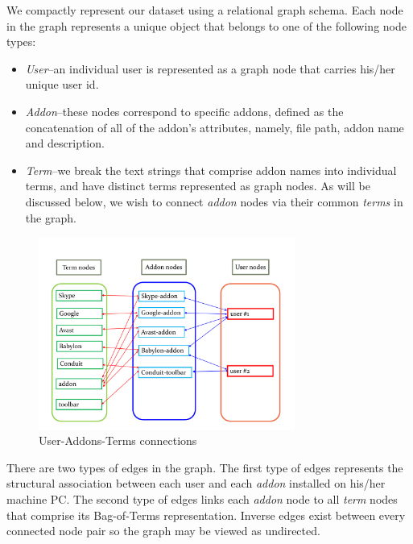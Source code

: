 \documentclass[ijoc,nonblindrev]{informs3} %
\numberwithin{equation}{subsection}
\begin{document}
We compactly represent our dataset using a relational graph schema. Each node in the graph represents a unique object that belongs to one of the following node types:
\begin{itemize}
\renewcommand{\labelitemi}{$\bullet$} 
\item {\it User}--an individual user is represented as a graph node that carries his/her unique user id. 
\item {\it Addon}--these nodes correspond to specific addons, defined as the concatenation of all of the addon's attributes, namely, file path, addon name and description.
\item {\it Term}--we break the text strings that comprise addon names into individual terms, and have distinct terms represented as graph nodes. As will be discussed below, we wish to connect {\it addon} nodes via their common {\it terms} in the graph.
\end{itemize}

\begin{figure}[!htbp]
\centering
\begin{small}
\includegraphics[width=0.75\textwidth]{figures/symbolic_graph.pdf}
\end{small}
\caption{User-Addons-Terms connections}
\label{fig:symbolic_graph}
\end{figure}

There are two types of edges in the graph. The first type of edges represents the structural association between each user and each {\it addon} installed on his/her machine PC. The second type of edges links each {\it addon} node to all {\it term} nodes that comprise its Bag-of-Terms representation. Inverse edges exist between every connected node pair so the graph may be viewed as undirected. 
\end{document}
